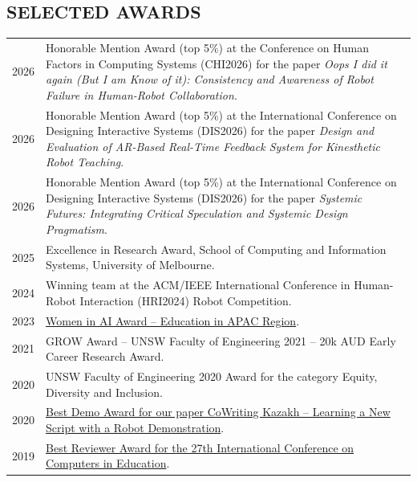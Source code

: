 
\subsection{SELECTED AWARDS}
\vspace{2pt}

\noindent
\begin{tabularx}{\textwidth}{@{}lX@{}}
2026 & Honorable Mention Award (top 5\%) at the Conference on Human Factors in Computing Systems (CHI2026) for the paper \textit{Oops I did it again (But I am Know of it): Consistency and Awareness of Robot Failure in Human-Robot Collaboration.} \\[2pt]
2026 & Honorable Mention Award (top 5\%) at the International Conference on Designing Interactive Systems (DIS2026) for the paper \textit{Design and Evaluation of AR-Based Real-Time Feedback System for Kinesthetic Robot Teaching}. \\[2pt]
2026 & Honorable Mention Award (top 5\%) at the International Conference on Designing Interactive Systems (DIS2026) for the paper \textit{Systemic Futures: Integrating Critical Speculation and Systemic Design Pragmatism}. \\[2pt]
2025 & Excellence in Research Award, School of Computing and Information Systems, University of Melbourne. \\[2pt]
2024 & Winning team at the ACM/IEEE International Conference in Human-Robot Interaction (HRI2024) Robot Competition. \\[2pt]
2023 & \href{https://www.womeninai.co/waiawards2023apac}{Women in AI Award -- Education in APAC Region}. \\[2pt]
2021 & GROW Award -- UNSW Faculty of Engineering 2021 -- 20k AUD Early Career Research Award. \\[2pt]
2020 & UNSW Faculty of Engineering 2020 Award for the category Equity, Diversity and Inclusion. \\[2pt]
2020 & \href{http://humanrobotinteraction.org/2020/best-paper-awards/}{Best Demo Award for our paper CoWriting Kazakh -- Learning a New Script with a Robot Demonstration}. \\[2pt]
2019 & \href{http://ilt.nutn.edu.tw/icce2019/04_Best\%20Reviewer\%20Award.html}{Best Reviewer Award for the 27th International Conference on Computers in Education}. \\[2pt]

\end{tabularx}
